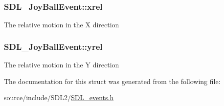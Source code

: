 \subsubsection[{xrel}]{ S\+D\+L\+\_\+\+Joy\+Ball\+Event\+::xrel}\label{struct_s_d_l___joy_ball_event_a959a8473aa1964e5e1778c27a9ffd261}
The relative motion in the X direction \hypertarget{struct_s_d_l___joy_ball_event_a28ad48a9eb7a5d3ff62ccba09fcead76}{}
\subsubsection[{yrel}]{ S\+D\+L\+\_\+\+Joy\+Ball\+Event\+::yrel}\label{struct_s_d_l___joy_ball_event_a28ad48a9eb7a5d3ff62ccba09fcead76}
The relative motion in the Y direction 

The documentation for this struct was generated from the following file\+:\begin{DoxyCompactItemize}
\item 
source/include/\+S\+D\+L2/\hyperlink{_s_d_l__events_8h}{S\+D\+L\+\_\+events.\+h}\end{DoxyCompactItemize}
